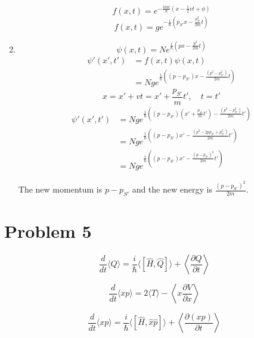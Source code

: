 \documentclass[12pt]{article}
\begin{document}
\begin{enumerate}
          \[
              f(x,t) = e^{- \frac{i m v}{\hbar}(x - \frac{1}{2}vt + \phi)}
          \]
          \[
              f(x,t) = g e^{- \frac{i}{\hbar} \left( p_{S'}x - \frac{p_{S'}^2}{2m} t \right)}
          \]
    \item
          \[
              \psi(x,t) = N e^{ \frac{i}{\hbar} \left( px - \frac{p^2}{2m} t \right)}
          \]
          \begin{equation*}
              \begin{split}
                  \psi'(x',t') & = f(x,t)\psi(x,t)                                                                  \\
                               & = Ng e^{ \frac{i}{\hbar} \left( (p-p_{S'})x - \frac{(p^2-p_{S'}^2)}{2m} t \right)}
              \end{split}
          \end{equation*}
          \[
              x = x'+vt = x'+\frac{p_{S'}}{m}t', \quad t = t'
          \]
          \begin{equation*}
              \begin{split}
                  \psi'(x',t')
                   & = Ng e^{ \frac{i}{\hbar} \left( (p-p_{S'})(x'+\frac{p_{S'}}{m}t') - \frac{(p^2-p_{S'}^2)}{2m} t' \right)} \\
                   & = Ng e^{ \frac{i}{\hbar} \left( (p-p_{S'})x'- \frac{(p^2-2pp_{S'}+p_{S'}^2)}{2m} t' \right)}              \\
                   & = Ng e^{ \frac{i}{\hbar} \left( (p-p_{S'})x'- \frac{(p-p_{S'})^2}{2m} t' \right)}
              \end{split}
          \end{equation*}

          The new momentum is $p - p_{S'}$ and the new energy is $\frac{(p-p_{S'})^2}{2m}$.
\end{enumerate}

\newpage
\section{Problem 5}

\[
    \frac{d}{dt} \langle Q \rangle = \frac{i}{\hbar} \langle [\hat{H}, \hat{Q}] \rangle + \left\langle \frac{\partial Q}{\partial t} \right\rangle
\]

\[
    \frac{d}{dt} \langle x p \rangle = 2 \langle T \rangle - \left\langle x \frac{\partial V}{\partial x} \right\rangle
\]

\[
    \frac{d}{dt} \langle x p \rangle
    = \frac{i}{\hbar} \langle [\hat{H}, \hat{x}\hat{p}] \rangle + \left\langle \frac{\partial (x p)}{\partial t} \right\rangle
\]
\end{document}
